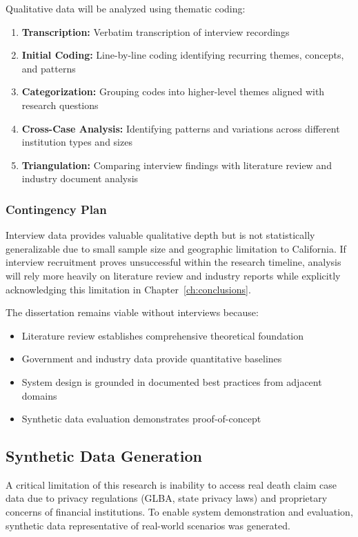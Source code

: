 Qualitative data will be analyzed using thematic coding:

\begin{enumerate}
\item \textbf{Transcription:} Verbatim transcription of interview recordings
\item \textbf{Initial Coding:} Line-by-line coding identifying recurring themes, concepts, and patterns
\item \textbf{Categorization:} Grouping codes into higher-level themes aligned with research questions
\item \textbf{Cross-Case Analysis:} Identifying patterns and variations across different institution types and sizes
\item \textbf{Triangulation:} Comparing interview findings with literature review and industry document analysis
\end{enumerate}

\subsubsection{Contingency Plan}

Interview data provides valuable qualitative depth but is not statistically generalizable due to small sample size and geographic limitation to California. If interview recruitment proves unsuccessful within the research timeline, analysis will rely more heavily on literature review and industry reports while explicitly acknowledging this limitation in Chapter~\ref{ch:conclusions}.

The dissertation remains viable without interviews because:
\begin{itemize}
\item Literature review establishes comprehensive theoretical foundation
\item Government and industry data provide quantitative baselines
\item System design is grounded in documented best practices from adjacent domains
\item Synthetic data evaluation demonstrates proof-of-concept
\end{itemize}

\subsection{Synthetic Data Generation}

A critical limitation of this research is inability to access real death claim case data due to privacy regulations (GLBA, state privacy laws) and proprietary concerns of financial institutions. To enable system demonstration and evaluation, synthetic data representative of real-world scenarios was generated.

